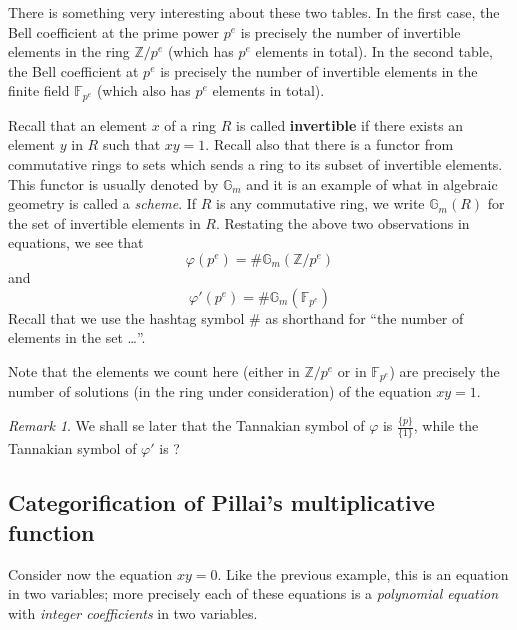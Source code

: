 \documentclass[a4paper]{article}
\theoremstyle{definition}
\theoremstyle{remark}
\newtheorem*{remark}{Remark}
\newcommand{\Z}{\mathbb{Z}}
\newcommand{\defhl}[1]{\textbf{#1}}
\begin{document}
There is something very interesting about these two tables. In the first case, the Bell coefficient at the prime power $p^e$ is precisely the number of invertible elements in the ring $\Z / p^e$ (which has $p^e$ elements in total). In the second table, the Bell coefficient at $p^e$ is precisely the number of invertible elements in the finite field $\mathbb{F}_{p^e}$ (which also has $p^e$ elements in total). 

Recall that an element $x$ of a ring $R$ is called \defhl{invertible} if there exists an element $y$ in $R$ such that $xy = 1$. Recall also that there is a functor from commutative rings to sets which sends a ring to its subset of invertible elements. This functor is usually denoted by $\mathbb{G}_m$ and it is an example of what in algebraic geometry is called a \emph{scheme}. If $R$ is any commutative ring, we write $\mathbb{G}_m(R)$ for the set of invertible elements in $R$. Restating the above two observations in equations, we see that
$$  \varphi(p^e) = \# \mathbb{G}_m(\Z / p^e)  $$
and 
$$  \varphi'(p^e) = \# \mathbb{G}_m(\mathbb{F}_{p^e})  $$
Recall that we use the hashtag symbol $\#$ as shorthand for ``the number of elements in the set \ldots''.

Note that the elements we count here (either in $\Z / p^e$ or in $\mathbb{F}_{p^e}$) are precisely the number of solutions (in the ring under consideration) of the equation $xy = 1$.


\begin{remark}
We shall se later that the Tannakian symbol of $\varphi$ is $\frac{ \{ p \} }{ \{ 1 \}  }$, while the Tannakian symbol of $\varphi'$ is ?
\end{remark}


\subsection{Categorification of Pillai's multiplicative function}

Consider now the equation $xy = 0$. Like the previous example, this is an equation in two variables; more precisely each of these equations is a \emph{polynomial equation} with \emph{integer coefficients} in two variables.
\end{document}
